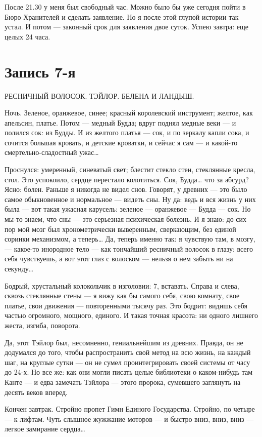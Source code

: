 \documentclass[11pt,openany]{book}
\newcommand{\bookchapterplain}[1]{%
  \clearpage\phantomsection\chapter*{#1}%
  \addcontentsline{toc}{chapter}{#1}\markboth{#1}{#1}\thispagestyle{plain}}
\begin{document}
После 21.30 у меня был свободный час. Можно было бы уже сегодня пойти в Бюро Хранителей и сделать заявление. Но я после этой глупой истории так устал. И потом --- законный срок для заявления двое суток. Успею завтра: еще целых 24 часа.

\bookchapterplain{Запись 7-я}

\begin{center}\textsc{РЕСНИЧНЫЙ ВОЛОСОК. ТЭЙЛОР. БЕЛЕНА И ЛАНДЫШ.}\end{center}

Ночь. Зеленое, оранжевое, синее; красный королевский инструмент; желтое, как апельсин, платье. Потом --- медный Будда; вдруг поднял медные веки --- и полился сок: из Будды. И из желтого платья --- сок, и по зеркалу капли сока, и сочится большая кровать, и детские кроватки, и сейчас я сам --- и какой-то смертельно-сладостный ужас\ldots{}

Проснулся: умеренный, синеватый свет; блестит стекло стен, стеклянные кресла, стол. Это успокоило, сердце перестало колотиться. Сок, Будда\ldots{} что за абсурд? Ясно: болен. Раньше я никогда не видел снов. Говорят, у древних --- это было самое обыкновенное и нормальное --- видеть сны. Ну да: ведь и вся жизнь у них была --- вот такая ужасная карусель: зеленое --- оранжевое --- Будда --- сок. Но мы-то знаем, что сны --- это серьезная психическая болезнь. И я знаю: до сих пор мой мозг был хронометрически выверенным, сверкающим, без единой соринки механизмом, а теперь\ldots{} Да, теперь именно так: я чувствую там, в мозгу, --- какое-то инородное тело --- как тончайший ресничный волосок в глазу: всего себя чувствуешь, а вот этот глаз с волоском --- нельзя о нем забыть ни на секунду\ldots{}

Бодрый, хрустальный колокольчик в изголовии: 7, вставать. Справа и слева, сквозь стеклянные стены --- я вижу как бы самого себя, свою комнату, свое платье, свои движения --- повторенными тысячу раз. Это бодрит: видишь себя частью огромного, мощного, единого. И такая точная красота: ни одного лишнего жеста, изгиба, поворота.

Да, этот Тэйлор был, несомненно, гениальнейшим из древних. Правда, он не додумался до того, чтобы распространить свой метод на всю жизнь, на каждый шаг, на круглые сутки --- он не сумел проинтегрировать своей системы от часу до 24-х. Но все же: как они могли писать целые библиотеки о каком-нибудь там Канте --- и едва замечать Тэйлора --- этого пророка, сумевшего заглянуть на десять веков вперед.

Кончен завтрак. Стройно пропет Гимн Единого Государства. Стройно, по четыре --- к лифтам. Чуть слышное жужжание моторов --- и быстро вниз, вниз, вниз --- легкое замирание сердца\ldots{}
\end{document}
